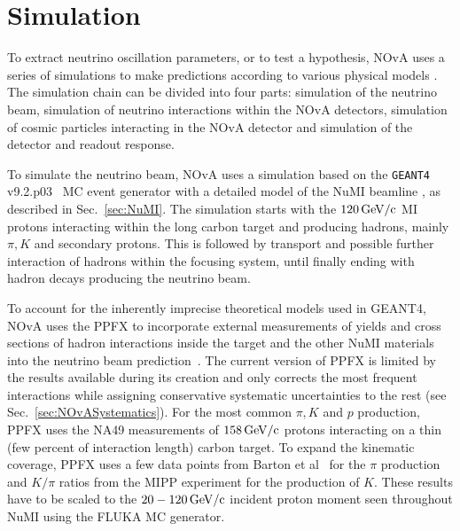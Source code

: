 \section{Simulation}\label{sec:NOvASimulation}
To extract neutrino oscillation parameters, or to test a hypothesis, \gls{NOvA} uses a series of simulations to make predictions according to various physical models \cite{NOvASimulationOld-Fluka.pdf}.
The simulation chain can be divided into four parts: simulation of the neutrino beam, simulation of neutrino interactions within the \gls{NOvA} detectors, simulation of cosmic particles interacting in the \gls{NOvA} detector and simulation of the detector and readout response.

To simulate the neutrino beam, \gls{NOvA} uses a simulation based on the \texttt{GEANT4} v9.2.p03~\cite{GEANT4.pdf} \gls{MC} event generator with a detailed model of the \gls{NuMI} beamline \cite{ZPavlovicThesisG4NuMI_2008.pdf}, as described in Sec.~\ref{sec:NuMI}. The simulation starts with the $\unit[120]{GeV/c}$ \gls{MI} protons interacting within the long carbon target and producing hadrons, mainly $\pi, K$ and secondary protons. This is followed by transport and possible further interaction of hadrons within the focusing system, until finally ending with hadron decays producing the neutrino beam.

To account for the inherently imprecise theoretical models used in GEANT4, \gls{NOvA} uses the \gls{PPFX} to incorporate external measurements of yields and cross sections of hadron interactions inside the target and the other \gls{NuMI} materials into the neutrino beam prediction~\cite{NuMIFlux.pdf}. The current version of \gls{PPFX} is limited by the results available during its creation and only corrects the most frequent interactions while assigning conservative systematic uncertainties to the rest (see Sec.~\ref{sec:NOvASystematics}).
For the most common $\pi, K$ and $p$ production, \gls{PPFX} uses the NA49 measurements \cite{NA49:Inclusive_production_of_charged_pions.pdf, NA49DataKaons.pdf, NA49pc-proton2013.pdf} of $\unit[158]{GeV/c}$ protons interacting on a thin (few percent of interaction length) carbon target. To expand the kinematic coverage, \gls{PPFX} uses a few data points from Barton et al~\cite{BartonHadProd1983.pdf} for the $\pi$ production and $K/\pi$ ratios from the \gls{MIPP} \cite{pionToKaonIn_pC.pdf} experiment for the production of $K$. These results have to be scaled to the $\unit[20-120]{GeV/c}$ incident proton moment seen throughout \gls{NuMI} using the FLUKA \cite{FLUKA_01,FLUKA_02} \gls{MC} generator.

